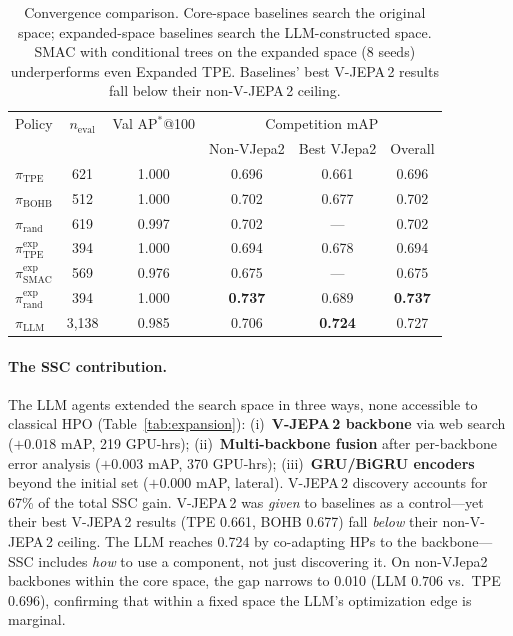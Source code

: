 \documentclass{article}
\newcommand{\APstar}{\mathrm{AP}^*}
\begin{document}
\begin{table}[t]
\centering
\caption{Convergence comparison. Core-space baselines search the original space; expanded-space baselines search the LLM-constructed space. SMAC with conditional trees on the expanded space (8 seeds) underperforms even Expanded TPE. Baselines' best V-JEPA\,2 results fall below their non-V-JEPA\,2 ceiling.}
\label{tab:convergence}
\small
\begin{tabular}{@{}lccccc@{}}
\toprule
Policy & $n_{\mathrm{eval}}$ & Val $\APstar$@100 & \multicolumn{3}{c}{Competition mAP} \\
 & & & Non-VJepa2 & Best VJepa2 & Overall \\
\midrule
$\pi_{\mathrm{TPE}}$ & 621 & 1.000 & 0.696 & 0.661 & 0.696 \\
$\pi_{\mathrm{BOHB}}$ & 512 & 1.000 & 0.702 & 0.677 & 0.702 \\
$\pi_{\mathrm{rand}}$ & 619 & 0.997 & 0.702 & --- & 0.702 \\
\midrule
$\pi_{\mathrm{TPE}}^{\mathrm{exp}}$ & 394 & 1.000 & 0.694 & 0.678 & 0.694 \\
$\pi_{\mathrm{SMAC}}^{\mathrm{exp}}$ & 569 & 0.976 & 0.675 & --- & 0.675 \\
$\pi_{\mathrm{rand}}^{\mathrm{exp}}$ & 394 & 1.000 & \textbf{0.737} & 0.689 & \textbf{0.737} \\
\midrule
$\pi_{\mathrm{LLM}}$ & 3{,}138 & 0.985 & 0.706 & \textbf{0.724} & 0.727 \\
\bottomrule
\end{tabular}
\end{table}

\paragraph{The SSC contribution.}
The LLM agents extended the search space in three ways, none accessible to classical HPO (Table~\ref{tab:expansion}):
(i)~\textbf{V-JEPA\,2 backbone} via web search ($+0.018$ mAP, 219 GPU-hrs);
(ii)~\textbf{Multi-backbone fusion} after per-backbone error analysis ($+0.003$ mAP, 370 GPU-hrs);
(iii)~\textbf{GRU/BiGRU encoders} beyond the initial set ($+0.000$ mAP, lateral).
V-JEPA\,2 discovery accounts for 67\% of the total SSC gain.
V-JEPA\,2 was \emph{given} to baselines as a control---yet their best V-JEPA\,2 results (TPE 0.661, BOHB 0.677) fall \emph{below} their non-V-JEPA\,2 ceiling. The LLM reaches 0.724 by co-adapting HPs to the backbone---SSC includes \emph{how} to use a component, not just discovering it.
On non-VJepa2 backbones within the core space, the gap narrows to 0.010 (LLM $0.706$ vs.\ TPE $0.696$), confirming that within a fixed space the LLM's optimization edge is marginal.
\end{document}
